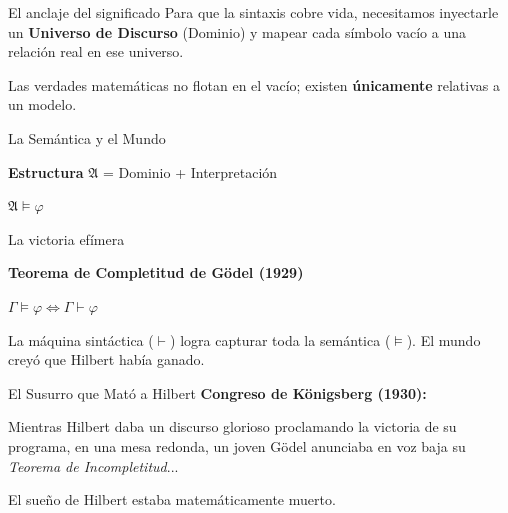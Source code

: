 \documentclass[10pt, aspectratio=169]{beamer}
\begin{document}
\begin{frame}{El anclaje del significado}
    \vspace{0.5cm}
    \Large
    Para que la sintaxis cobre vida, necesitamos inyectarle un \textbf{Universo de Discurso} (Dominio) y mapear cada símbolo vacío a una relación real en ese universo.
    
    \vspace{0.8cm}
    \normalsize
    \alert{Las verdades matemáticas no flotan en el vacío; existen \textbf{únicamente} relativas a un modelo.}
\end{frame}
\begin{frame}{La Semántica y el Mundo}
    \begin{center}
        \vspace{0.5cm}
        \Large \textbf{Estructura} $\mathfrak{A}$ = Dominio + Interpretación
        
        \vspace{1.2cm}
        \huge
        $\mathfrak{A} \models \varphi$
    \end{center}
\end{frame}


\begin{frame}{La victoria efímera}
    \begin{center}
        \Large \textbf{Teorema de Completitud de Gödel (1929)}
        
        \vspace{0.8cm}
        \huge
        $\Gamma \models \varphi \iff \Gamma \vdash \varphi$
    \end{center}
    
    \vspace{0.8cm}
    \normalsize
    La máquina sintáctica ($\vdash$) logra capturar toda la semántica ($\models$). El mundo creyó que Hilbert había ganado.
\end{frame}
\begin{frame}{El Susurro que Mató a Hilbert}
    \vspace{0.5cm}
    \Large \textbf{Congreso de Königsberg (1930):}
    
    \vspace{0.6cm}
    \normalsize
    Mientras Hilbert daba un discurso glorioso proclamando la victoria de su programa, en una mesa redonda, un joven Gödel anunciaba en voz baja su \textit{Teorema de Incompletitud}... 
    
    \vspace{0.8cm}
    \alert{\Large El sueño de Hilbert estaba matemáticamente muerto.}
\end{frame}
\end{document}
